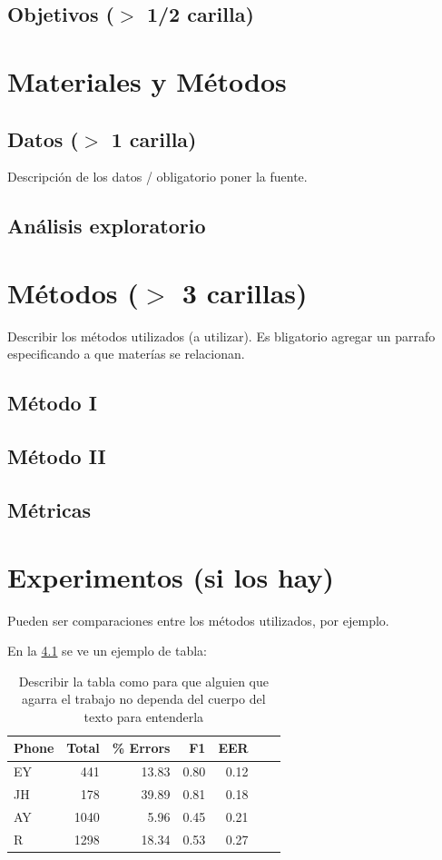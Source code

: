 \documentclass[11pt,a4paper,twoside]{tesis}
\begin{document}
\section{Objetivos ($>$ 1/2 carilla)}

\chapter{Materiales y Métodos}

\section{Datos ($>$ 1 carilla)} 
Descripción de los datos / obligatorio poner la fuente.

\section{Análisis exploratorio}

\chapter{Métodos ($>$ 3 carillas)}
Describir los métodos utilizados (a utilizar). 
Es bligatorio agregar un parrafo especificando a que materías se relacionan.

\section{Método I }
\section{Método II}
\section{Métricas}

\chapter{Experimentos (si los hay)}
Pueden ser comparaciones entre los métodos utilizados, por ejemplo. 

En la \ref{table:tab} se ve un ejemplo de tabla:
\begin{table}[h!]
\centering
\footnotesize
\begin{tabular}{lrrrrrr}
\hline
Phone &  Total & \% Errors &F1 &  EER \\
\hline
   EY &    441 &  13.83 & 0.80 & 0.12 \\
   JH &    178 &  39.89 & 0.81 & 0.18 \\
   AY &   1040 &   5.96 & 0.45 & 0.21 \\
    R &   1298 &  18.34 & 0.53 & 0.27 \\
\hline
\end{tabular}
\caption{Describir la tabla como para que alguien que agarra el trabajo no dependa del cuerpo del texto para entenderla}
\label{table:tab}
\end{table}
\end{document}
